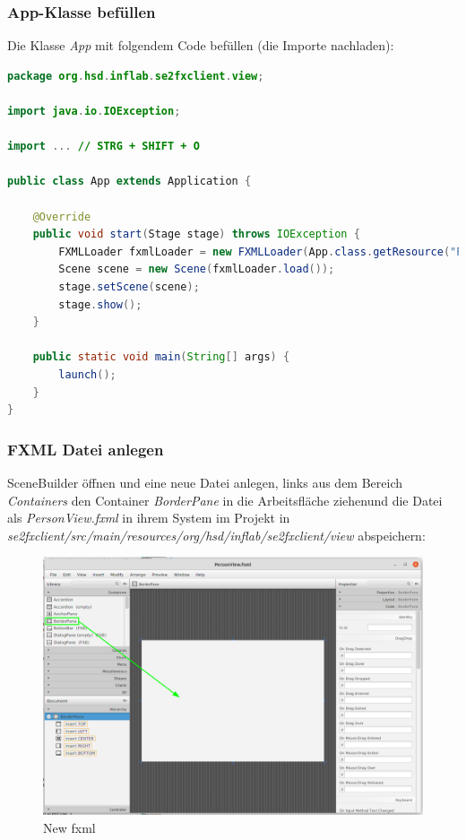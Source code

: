 \documentclass[11pt]{scrartcl}
\begin{document}
\newpage
\subsubsection{App-Klasse befüllen}
\label{sec:fillappclass}

Die Klasse \textit{App} mit folgendem Code befüllen (die Importe nachladen):

\begin{lstlisting}[language=java]
package org.hsd.inflab.se2fxclient.view;

import java.io.IOException;

import ... // STRG + SHIFT + O

public class App extends Application {

    @Override
    public void start(Stage stage) throws IOException {
        FXMLLoader fxmlLoader = new FXMLLoader(App.class.getResource("PersonView.fxml"));
        Scene scene = new Scene(fxmlLoader.load());
        stage.setScene(scene);
        stage.show();
    }

    public static void main(String[] args) {
        launch();
    }
}    
\end{lstlisting}

\newpage
\subsubsection{FXML Datei anlegen}
\label{sec:createfxml}

SceneBuilder öffnen und eine neue Datei anlegen,
links aus dem Bereich \textit{Containers} den Container
\textit{BorderPane} in die Arbeitsfläche ziehen\newline und die Datei als \textit{PersonView.fxml}
in ihrem System im Projekt
in \textit{se2fxclient/src/main/resources/org/hsd/inflab/se2fxclient/view} abspeichern:

\begin{figure}[!ht]
    \includegraphics[width=\linewidth]{images/eclipse23_new_fxml.png}
    \caption{New fxml}
    \label{fig:newfxml}
\end{figure}
\end{document}
